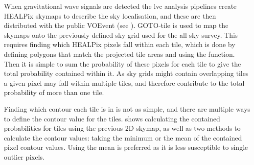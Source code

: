 \begin{colsection}
\begin{colsection}
When gravitational wave signals are detected the \gls{lvc} analysis pipelines create HEALPix skymaps to describe the sky localisation, and these are then distributed with the public VOEvent (see ). GOTO-tile is used to map the skymaps onto the previously-defined sky grid used for the all-sky survey. This requires finding which HEALPix pixels fall within each tile, which is done by defining polygons that match the projected tile areas and using the   function. Then it is simple to sum the probability of these pixels for each tile to give the total probability contained within it. As sky grids might contain overlapping tiles a given pixel may fall within multiple tiles, and therefore contribute to the total probability of more than one tile.

Finding which contour each tile is in is not as simple, and there are multiple ways to define the contour value for the tiles.  shows calculating the contained probabilities for tiles using the previous 2D skymap, as well as two methods to calculate the contour values: taking the minimum or the mean of the contained pixel contour values. Using the mean is preferred as it is less susceptible to single outlier pixels.


\begin{figure}[p]


\end{figure}
\end{colsection}
\end{colsection}
